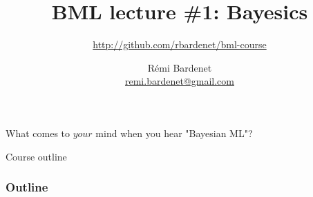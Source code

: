 \documentclass[10pt]{beamer}
\title[Bayesian ML: Bayesics]{BML lecture \#1: Bayesics}
\subtitle{\url{http://github.com/rbardenet/bml-course}}
\author[Rémi Bardenet (CNRS \& Univ. Lille)] %
{Rémi Bardenet\\ \url{remi.bardenet@gmail.com}}
\institute[] %
{
  CNRS \& CRIStAL, Univ. Lille, France\\
\vspace{1cm}
\texttt{[image: /Users/rbardenet/Work/Tex/PosterImages/logoCNRS.pdf]}
\qquad \texttt{[image: /Users/rbardenet/Work/Tex/PosterImages/cristalLogo.pdf]}
}
\date{}
\begin{document}
\begin{frame}
\maketitle
\end{frame}

\begin{frame}{What comes to $your$ mind when you hear "Bayesian ML"?}

\end{frame}

\begin{frame}{Course outline}

\end{frame}

\begin{frame}
\frametitle{Outline}
\tableofcontents
\end{frame}


\end{document}
